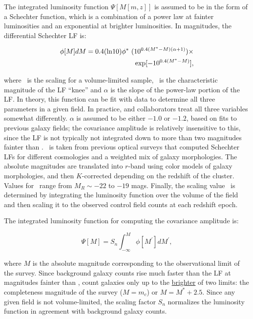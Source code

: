 \documentclass[useAMS,usenatbib]{mn2e}
\begin{document}

The integrated luminosity function $\Psi[M[m,z]]$ is assumed to be in the form of a Schechter function, which is a combination of a power law at fainter luminosities and an exponential at brighter luminosities. In magnitudes, the differential Schechter LF is:

\begin{eqnarray}
\label{eqn-schechter}
\phi[M] dM = 0.4 ({\rm ln} 10) \phi^*~(10^{0.4(M^* - M)(\alpha + 1)}) \times \nonumber \\
{\rm exp}[-10^{0.4(M^*-M)}],
\end{eqnarray}

\noindent where \phistar~is the scaling for a volume-limited sample, \mstar~is the characteristic magnitude of the LF ``knee'' and $\alpha$ is the slope of the power-law portion of the LF. In theory, this function can be fit with data to determine all three parameters in a given field. In practice, \citet{yee87} and collaborators treat all three variables somewhat differently. $\alpha$ is assumed to be either $-1.0$ or $-1.2$, based on fits to previous galaxy fields; the covariance amplitude is relatively insensitive to this, since the LF is not typically not integrated down to more than two magnitudes fainter than \mstar. \mstar~is taken from previous optical surveys \citep{kin85,seb86} that computed Schechter LFs for different cosmologies and a weighted mix of galaxy morphologies. The absolute magnitudes are translated into $r$-band using color models of galaxy morphologies, and then $K$-corrected depending on the redshift of the cluster. Values for \mstar~range from $M_R\sim-22$ to $-19$ mags. Finally, the scaling value \phistar~is determined by integrating the luminosity function over the volume of the field and then scaling it to the observed control field counts at each redshift epoch. 

The integrated luminosity function for computing the covariance amplitude is:

\begin{equation}
\label{eqn-schechter_int}
\Psi[M] = S_n \int_{-\infty}^{M} \phi[M^\prime] dM^\prime, 
\end{equation}

\noindent where $M$ is the absolute magnitude corresponding to the observational limit of the survey. Since background galaxy counts rise much faster than the LF at magnitudes fainter than \mstar, \citet{yee87} count galaxies only up to the \underline{brighter} of two limits: the completeness magnitude of the survey ($M=m_c$) or $M=M^* + 2.5$. Since any given field is not volume-limited, the scaling factor $S_n$ normalizes the luminosity function in agreement with background galaxy counts. 
\end{document}
